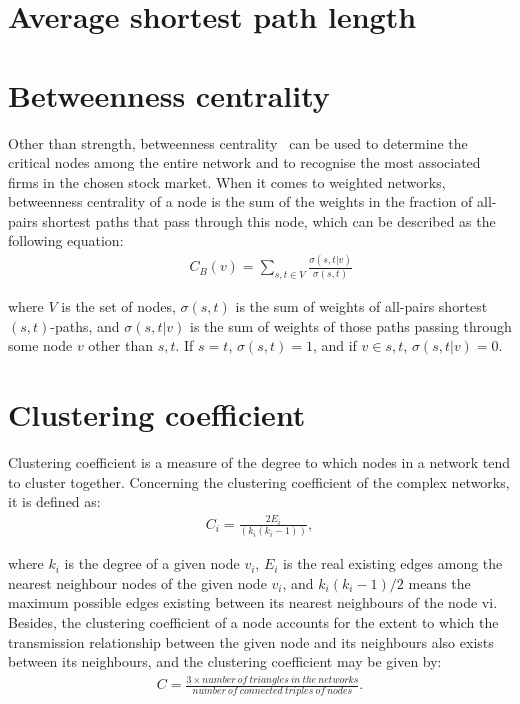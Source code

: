 \section{Average shortest path length}

\section{Betweenness centrality}

Other than strength, betweenness centrality~\cite{freeman1977set} can be used to determine the critical nodes among the entire network and to recognise the most associated firms in the chosen stock market. When it comes to weighted networks, betweenness centrality of a node is the sum of the weights in the fraction of all-pairs shortest paths that pass through this node, which can be described as the following equation:
\begin{eqnarray}
&&C_B(v)=\sum_{s,t \in V}\frac{\sigma(s,t|v)}{\sigma(s,t)}
\end{eqnarray}

where $V$ is the set of nodes, $\sigma(s,t)$ is the sum of weights of all-pairs shortest $(s,t)$-paths, and $\sigma(s,t|v)$ is the sum of weights of those paths passing through some node $v$ other than $s,t$. If $s=t$, $\sigma(s,t)=1$, and if $v\in s,t$, $\sigma(s,t|v)=0$.

\section{Clustering coefficient} %
Clustering coefficient is a measure of the degree to which nodes in a network tend to cluster together. Concerning the clustering coefficient of the complex networks, it is defined as:
\begin{eqnarray}
C_i=\frac{2E_i}{(k_i(k_i-1))},
\end{eqnarray}

where $k_i$ is the degree of a given node $v_i$, $E_i$ is the real existing edges among the nearest neighbour nodes of the given node $v_i$, and $k_i(k_i-1)/2$ means the maximum possible edges existing between its nearest neighbours of the node vi. Besides, the clustering coefficient of a node accounts for the extent to which the transmission relationship between the given node and its neighbours also exists between its neighbours, and the clustering coefficient may be given by:
\begin{eqnarray}
C=\frac{3\times number\ of\ triangles\ in\ the\ networks}{number\ of\ connected\ triples\ of\ nodes}.
\end{eqnarray}


